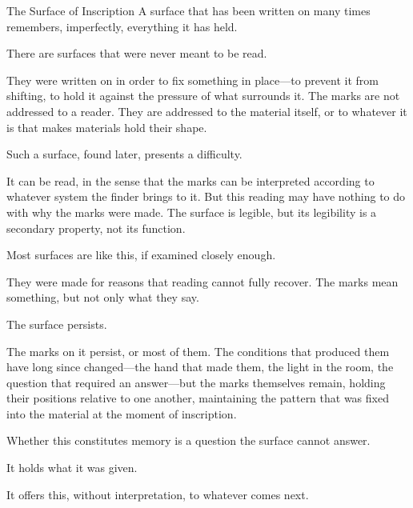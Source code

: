 \begin{interlude}{The Surface of Inscription}
A surface that has been written on many times remembers, imperfectly,
everything it has held.

\medskip

There are surfaces that were never meant to be read.

They were written on in order to fix something in place---to
prevent it from shifting, to hold it against the pressure of what
surrounds it. The marks are not addressed to a reader. They are
addressed to the material itself, or to whatever it is that makes
materials hold their shape.

Such a surface, found later, presents a difficulty.

It can be read, in the sense that the marks can be interpreted
according to whatever system the finder brings to it. But this
reading may have nothing to do with why the marks were made. The
surface is legible, but its legibility is a secondary property,
not its function.

Most surfaces are like this, if examined closely enough.

They were made for reasons that reading cannot fully recover. The
marks mean something, but not only what they say.

\medskip

The surface persists.

The marks on it persist, or most of them. The conditions that
produced them have long since changed---the hand that made them,
the light in the room, the question that required an answer---but
the marks themselves remain, holding their positions relative to
one another, maintaining the pattern that was fixed into the
material at the moment of inscription.

Whether this constitutes memory is a question the surface cannot
answer.

It holds what it was given.

It offers this, without interpretation, to whatever comes next.

\end{interlude}
